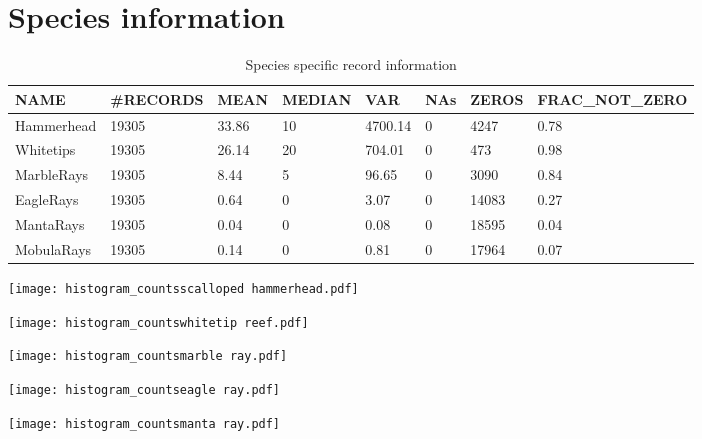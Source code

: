 \documentclass[a4paper]{article}
\begin{document}
\clearpage



\section{Species information}


\begin{table}[h!]
\centering
\begin{tabular}{llllllll}
  \hline
NAME & \#RECORDS & MEAN & MEDIAN & VAR & NAs & ZEROS & FRAC\_NOT\_ZERO \\ 
  \hline
Hammerhead & 19305 & 33.86 & 10 & 4700.14 & 0 & 4247 & 0.78 \\ 
  Whitetips & 19305 & 26.14 & 20 & 704.01 & 0 & 473 & 0.98 \\ 
  MarbleRays & 19305 & 8.44 & 5 & 96.65 & 0 & 3090 & 0.84 \\ 
  EagleRays & 19305 & 0.64 & 0 & 3.07 & 0 & 14083 & 0.27 \\ 
  MantaRays & 19305 & 0.04 & 0 & 0.08 & 0 & 18595 & 0.04 \\ 
  MobulaRays & 19305 & 0.14 & 0 & 0.81 & 0 & 17964 & 0.07 \\ 
   \hline
\end{tabular}
\caption{Species specific record information} 
\label{species_info}
\end{table}



\texttt{[image: histogram\_countsscalloped hammerhead.pdf]}

\texttt{[image: histogram\_countswhitetip reef.pdf]}

\texttt{[image: histogram\_countsmarble ray.pdf]}

\texttt{[image: histogram\_countseagle ray.pdf]}

\texttt{[image: histogram\_countsmanta ray.pdf]}
\end{document}
